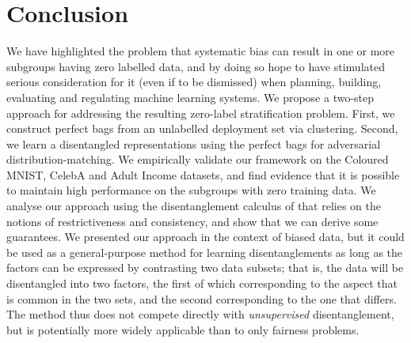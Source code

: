 %
%
%
%
%
\section{Conclusion}
We have highlighted the problem that systematic bias can result in one or more subgroups having zero labelled data, and by doing so hope to have stimulated serious consideration for it (even if to be dismissed) when planning, building, evaluating and regulating machine learning systems.
We propose a two-step approach for addressing the resulting zero-label stratification problem.
First, we construct perfect bags from an unlabelled deployment set via  clustering. 
Second, we learn a disentangled representations using the perfect bags for adversarial distribution-matching. 
We empirically validate our framework on the Coloured MNIST, CelebA and Adult Income datasets, and find evidence that it is possible to maintain high performance on the subgroups with zero training data. 
We analyse our approach using the disentanglement calculus of \citet{ShuCheKumErmetal20} that relies on the notions of restrictiveness and consistency, and show that we can derive some guarantees.
We presented our approach in the context of biased data,
but it could be used as a general-purpose method for learning disentanglements
as long as the factors can be expressed by contrasting two data subsets;
that is, the data will be disentangled into two factors,
the first of which corresponding to the aspect that is common in the two sets,
and the second corresponding to the one that differs.
The method thus does not compete directly with \emph{unsupervised} disentanglement,
but is potentially more widely applicable than to only fairness problems.

